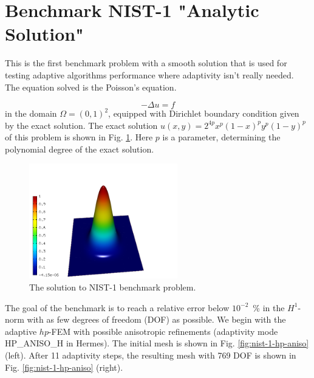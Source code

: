 \section{Benchmark NIST-1 "Analytic Solution"}
\label{sec:bench-1}

This is the first benchmark problem with a smooth solution
that is used for testing adaptive algorithms performance
where adaptivity isn't really needed.
The equation solved is the Poisson's equation.

\begin{equation} \label{poisson}
-\Delta u = f 
\end{equation}
in the domain $\Omega = (0, 1)^2$, equipped with Dirichlet
boundary condition given by the exact solution.
The exact solution $u(x, y) = 2^{4p}x^{p}(1-x)^{p}y^{p}(1-y)^{p}$
of this problem is shown in Fig. \ref{fig:sln-nist01}.
Here $p$ is a parameter, determining the polynomial degree of the exact solution.

\begin{figure}[!ht]
\centering
\includegraphics[height=5cm]{nist/nist-1/solution.png}
\caption{The solution to NIST-1 benchmark problem.}
\label{fig:sln-nist01}
\end{figure}

The goal of the benchmark is to reach a relative error below
$10^{-2}$~\% in the $H^1$-norm with as few degrees of freedom (DOF) as possible.
We begin with the adaptive $hp$-FEM with possible anisotropic refinements (adaptivity mode
HP\_ANISO\_H in {\sc Hermes}). The initial mesh is shown in Fig. \ref{fig:nist-1-hp-aniso} (left).
After 11 adaptivity steps, the resulting mesh with 769 DOF is shown in Fig. \ref{fig:nist-1-hp-aniso} (right).

